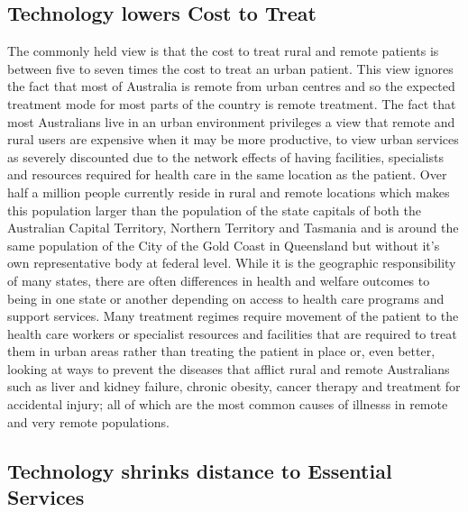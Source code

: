 \subsection{Technology lowers Cost to Treat}
The commonly held view is that the cost to treat rural and remote patients is between five to seven times the cost to treat an urban patient. 
This view ignores the fact that most of Australia is remote from urban centres and so the expected treatment mode for most parts of the country is remote treatment. The fact that most Australians live in an urban environment privileges a view that remote and rural users are expensive when it may be more productive, to view urban services as severely discounted due to the network effects of having facilities, specialists and resources required for health care in the same location as the patient. Over half a million people currently reside in rural and remote locations \cite[p7]{RefWorks:197} which makes this population larger than the population of the state capitals of both the Australian Capital Territory, Northern Territory and Tasmania and is around the same population of the City of the Gold Coast\cite{RefWorks:199} in Queensland but without it's own representative body at federal level. While it is the geographic responsibility of  many states, there are often differences in health and welfare outcomes to being in one state or another depending on access to health care programs and support services.
Many treatment regimes require movement of the patient to the health care workers or specialist resources and facilities that are required to treat them in urban areas rather than treating the patient in place or, even better, looking at ways to prevent the diseases that afflict rural and remote Australians such as liver and kidney failure, chronic obesity, cancer therapy and treatment for accidental injury; all of which are the most common causes of illnesss in remote and very remote populations.


\subsection{Technology shrinks distance to Essential Services}

